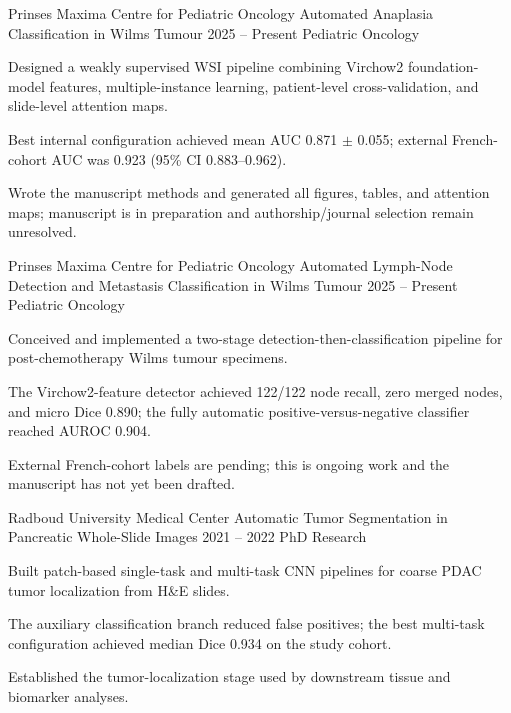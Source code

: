
\begin{cventries}
\cventry
  {Prinses Maxima Centre for Pediatric Oncology}
  {Automated Anaplasia Classification in Wilms Tumour}
  {2025 -- Present}
  {Pediatric Oncology}
  {
    \begin{cvitems}
      \item {Designed a weakly supervised WSI pipeline combining Virchow2 foundation-model features, multiple-instance learning, patient-level cross-validation, and slide-level attention maps.}
      \item {Best internal configuration achieved mean AUC 0.871 $\pm$ 0.055; external French-cohort AUC was 0.923 (95\% CI 0.883--0.962).}
      \item {Wrote the manuscript methods and generated all figures, tables, and attention maps; manuscript is in preparation and authorship/journal selection remain unresolved.}
    \end{cvitems}
  }

\cventry
  {Prinses Maxima Centre for Pediatric Oncology}
  {Automated Lymph-Node Detection and Metastasis Classification in Wilms Tumour}
  {2025 -- Present}
  {Pediatric Oncology}
  {
    \begin{cvitems}
      \item {Conceived and implemented a two-stage detection-then-classification pipeline for post-chemotherapy Wilms tumour specimens.}
      \item {The Virchow2-feature detector achieved 122/122 node recall, zero merged nodes, and micro Dice 0.890; the fully automatic positive-versus-negative classifier reached AUROC 0.904.}
      \item {External French-cohort labels are pending; this is ongoing work and the manuscript has not yet been drafted.}
    \end{cvitems}
  }

\cventry
  {Radboud University Medical Center}
  {Automatic Tumor Segmentation in Pancreatic Whole-Slide Images}
  {2021 -- 2022}
  {PhD Research}
  {
    \begin{cvitems}
      \item {Built patch-based single-task and multi-task CNN pipelines for coarse PDAC tumor localization from H\&E slides.}
      \item {The auxiliary classification branch reduced false positives; the best multi-task configuration achieved median Dice 0.934 on the study cohort.}
      \item {Established the tumor-localization stage used by downstream tissue and biomarker analyses.}
    \end{cvitems}
  }


\end{cventries}
